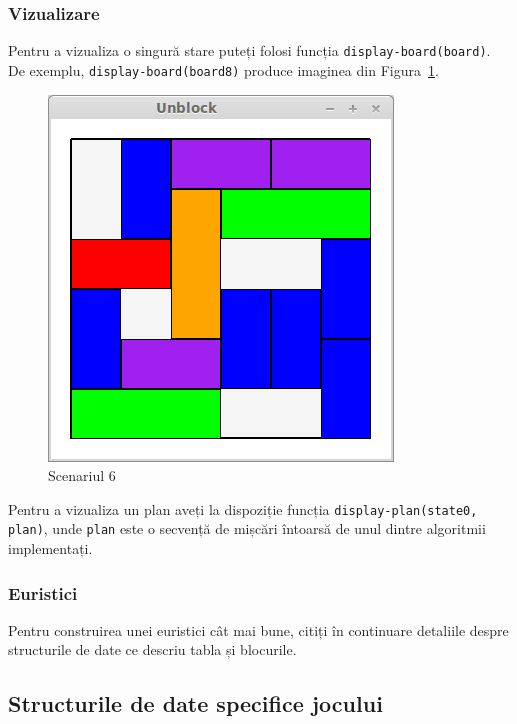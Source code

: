 \documentclass[12pt]{article}
\begin{document}
\subsubsection*{Vizualizare} Pentru a vizualiza o singură stare puteți
folosi funcția \texttt{display-board(board)}. De exemplu,
\texttt{display-board(board8)} produce imaginea din
Figura~\ref{fig:5}.

\begin{figure}[h!]
  \centering \includegraphics[width=.5\textwidth]{board6.png}
  \caption{Scenariul 6}
  \label{fig:5}
\end{figure}

Pentru a vizualiza un plan aveți la dispoziție funcția
\texttt{display-plan(state0, plan)}, unde \texttt{plan} este o
secvență de mișcări întoarsă de unul dintre algoritmii implementați.

\subsubsection*{Euristici}

Pentru construirea unei euristici cât mai bune, citiți în continuare 
detaliile despre structurile de date ce descriu tabla și blocurile.

\subsection{Structurile de date specifice jocului}
\label{sec:datastructs}
\end{document}
